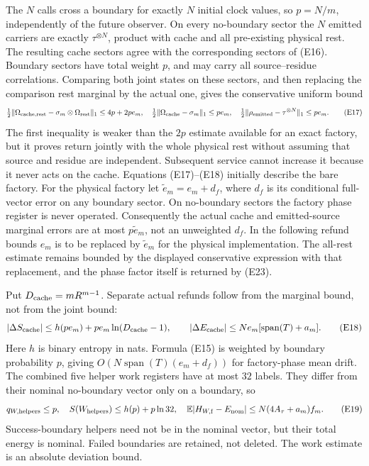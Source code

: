 \documentclass[11pt]{article}
\theoremstyle{definition}
\theoremstyle{remark}
\begin{document}
The \(N\) calls cross a boundary for exactly \(N\) initial clock
values, so \(p=N/m\), independently of the future observer.
On every no-boundary sector the \(N\) emitted carriers are exactly
\(\tau^{\otimes N}\), product with cache and all pre-existing physical
rest. The resulting cache sectors agree with the corresponding
sectors of (E16). Boundary sectors have total weight \(p\), and may
carry all source--residue correlations. Comparing both joint states
on these sectors, and then replacing the comparison rest marginal
by the actual one, gives the conservative uniform bound
\[
 \tfrac12\|\Omega_{\rm cache,rest}
                  -\sigma_m\otimes\Omega_{\rm rest}\|_1\le4p+2pe_m,
 \quad
 \tfrac12\|\Omega_{\rm cache}-\sigma_m\|_1\le pe_m,
 \quad
 \tfrac12\|\rho_{\rm emitted}-\tau^{\otimes N}\|_1\le pe_m.          \tag{E17}
\]
The first inequality is weaker than the \(2p\) estimate available
for an exact factory, but it proves return jointly with the whole
physical rest without assuming that source and residue are independent.
Subsequent service cannot increase it because it never acts on the cache.
Equations (E17)--(E18) initially describe the bare factory. For the
physical factory let \(\widetilde e_m=e_m+d_f\), where \(d_f\) is its
conditional full-vector error on any boundary sector. On no-boundary
sectors the factory phase register is never operated. Consequently
the actual cache and emitted-source marginal errors are at most
\(p\widetilde e_m\), not an unweighted \(d_f\). In the following
refund bounds \(e_m\) is to be replaced by \(\widetilde e_m\) for
the physical implementation. The all-rest estimate remains bounded
by the displayed conservative expression with that replacement,
and the phase factor itself is returned by (E23).

Put \(D_{\rm cache}=mR^{m-1}\). Separate actual refunds follow from
the marginal bound, not from the joint bound:
\[
 |\Delta S_{\rm cache}|
 \le h(pe_m)+pe_m\ln(D_{\rm cache}-1),\qquad
 |\Delta E_{\rm cache}|
 \le N e_m[\operatorname{span}(T)+a_m].              \tag{E18}
\]
Here \(h\) is binary entropy in nats. Formula (E15) is weighted by
boundary probability \(p\), giving \(O(N\operatorname{span}(T)
(e_m+d_f))\) for factory-phase mean drift.
The combined five helper work registers have at most \(32\) labels.
They differ from their nominal no-boundary vector only on a boundary,
so
\[
 q_{W,\rm helpers}\le p,\quad
 S(W_{\rm helpers})\le h(p)+p\ln32,\quad
 \mathbb E|H_{W,\rm f}-E_{\rm nom}|\le N(4A_\tau+a_m) f_m.  \tag{E19}
\]
Success-boundary helpers need not be in the nominal vector, but their
total energy is nominal. Failed boundaries are retained, not deleted.
The work estimate is an absolute deviation bound.
\end{document}
